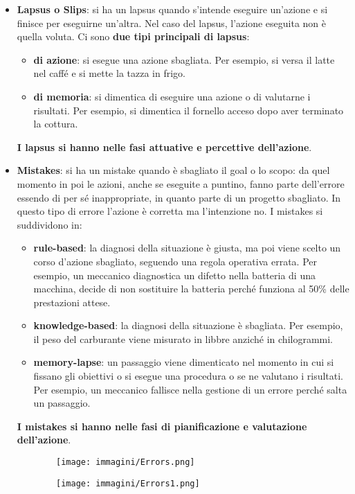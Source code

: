 \begin{itemize}
	\item \textbf{Lapsus o Slips}: si ha un lapsus quando s'intende eseguire un'azione e si finisce per eseguirne un'altra. Nel caso del lapsus, l'azione
	eseguita non è quella voluta. Ci sono \textbf{due tipi principali di lapsus}:
	\vspace{-3.5mm}
	\begin{itemize}
		\itemsep-0.3em
		\item \textbf{di azione}: si esegue una azione sbagliata. Per esempio, si versa il latte nel caffé e si mette la tazza in frigo.
		\item \textbf{di memoria}: si dimentica di eseguire una azione o di valutarne i risultati. Per esempio, si dimentica il fornello acceso
		dopo aver terminato la cottura.
	\end{itemize}
	\textbf{I lapsus si hanno nelle fasi attuative e percettive dell'azione}.
	\item \textbf{Mistakes}: si ha un mistake quando è sbagliato il goal o lo scopo: da quel momento in poi le azioni, anche
	se eseguite a puntino, fanno parte dell'errore essendo di per sé inappropriate, in quanto parte di un progetto sbagliato. In questo tipo di errore
	l'azione è corretta ma l'intenzione no.
	I mistakes si suddividono in:
	\vspace{-3.5mm}
	\begin{itemize}
		\itemsep-0.3em
		\item \textbf{rule-based}: la diagnosi della situazione è giusta, ma poi viene scelto un corso d'azione sbagliato, seguendo una regola
		operativa errata. Per esempio, un meccanico diagnostica un difetto nella batteria di una macchina, decide di non sostituire la batteria perché
		funziona al 50\% delle prestazioni attese.
		\item \textbf{knowledge-based}: la diagnosi della situazione è sbagliata. Per esempio, il peso del carburante viene misurato in libbre anziché
		in chilogrammi.
		\item \textbf{memory-lapse}: un passaggio viene dimenticato nel momento in cui si fissano gli obiettivi o si esegue una procedura o se ne
		valutano i risultati. Per esempio, un meccanico fallisce nella gestione di un errore perché salta un passaggio.
	\end{itemize}
	\textbf{I mistakes si hanno nelle fasi di pianificazione e valutazione dell'azione}.
\end{itemize}

\begin{figure}[h!]
	\begin{subfigure}{0.49 \linewidth} \centering
			\texttt{[image: immagini/Errors.png]}
	\end{subfigure}
	\begin{subfigure}{0.49 \linewidth} \centering
			\texttt{[image: immagini/Errors1.png]}
	\end{subfigure}
\end{figure}



